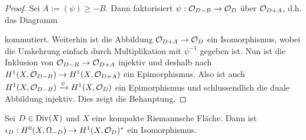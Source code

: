 \begin{proof}
  Sei $A := (\psi) \geq -B$. Dann faktorisiert $\psi: \mathcal{O}_{D-B} \rightarrow
  \mathcal{O}_D$ über $\mathcal{O}_{D+A}$, d.h. das Diagramm
  \begin{center}
  \end{center}
  kommutiert. Weiterhin ist die Abbildung $\mathcal{O}_{D+A} \rightarrow \mathcal{O}_D$ ein
  Isomorphismus, wobei die Umkehrung einfach durch Multiplikation mit
  $\psi^{-1}$ gegeben ist. Nun ist die Inklusion von $\mathcal{O}_{D-B} \rightarrow
  \mathcal{O}_{D+A}$ injektiv und deshalb nach \cite[Satz 16.8]{For} $H^1(X, \mathcal{O}_{D-B}) \rightarrow
  H^1(X, \mathcal{O}_{D+A})$ ein Epimorphismus. Also ist auch $H^1(X,
  \mathcal{O}_{D-B}) \xrightarrow{\psi} H^1(X, \mathcal{O}_D)$ ein Epimorphismus und
  schlussendlich die duale Abbildung injektiv. Dies zeigt die Behauptung.
\end{proof}

\begin{thm}
  \label{thm:serre}
  Sei $D \in \operatorname{Div}(X)$ und $X$ eine kompakte Riemannsche Fläche. Dann
  ist $\iota_D: H^0(X, \Omega_{-D}) \rightarrow H^1(X, \mathcal{O}_D)^\ast$ ein Isomorphismus.
\end{thm}

